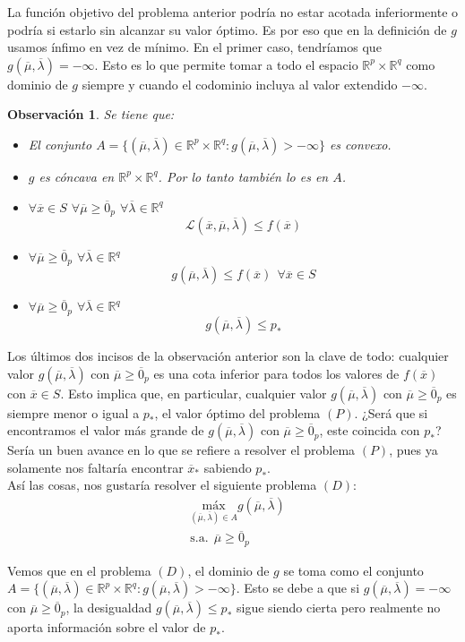 \documentclass[11pt]{report}
\newtheorem{observation}{Observación}[section]
\newcommand{\Rp}{\mathbb{R}^{p}}
\newcommand{\Rq}{\mathbb{R}^{q}}
\newcommand{\mv}{\overline{\mu}}
\newcommand{\lv}{\overline{\lambda}}
\newcommand{\x}{\overline{x}}
\newcommand{\zp}{\overline{0}_{p}}
\newcommand{\La}{\mathcal{L}}
\newcommand{\po}{p_{*}}
\newcommand{\xo}{\overline{x}_{*}}
\begin{document}
La función objetivo del problema anterior podría no estar acotada inferiormente o podría si estarlo sin alcanzar su valor óptimo. Es por eso que en la definición de $g$ usamos ínfimo en vez de mínimo. En el primer caso, tendríamos que $g(\mv, \lv)=-\infty$. Esto es lo que permite tomar a todo el espacio $\Rp\times\Rq$ como dominio de $g$ siempre y cuando el codominio incluya al valor extendido $-\infty$.

\begin{observation} Se tiene que:
\begin{itemize}
\item[(i)] El conjunto $A=\{(\mv,\lv)\in\Rp\times\Rq: g(\mv,\lv)>-\infty\}$ es convexo.
\item[(ii)] $g$ es cóncava en $\Rp\times\Rq$. Por lo tanto también lo es en $A$.
\item[(iii)] $\forall\x\in S$ $\forall \mv\geq\zp$ $\forall\lv\in\Rq$
$$\La(\x,\mv, \lv)\leq f(\x)$$
\item[(iv)] $\forall \mv\geq\zp$ $\forall\lv\in\Rq$
$$g(\mv,\lv)\leq f(\x)\ \ \forall\x \in S$$
\item[(v)] $\forall \mv\geq\zp$ $\forall\lv\in\Rq$
$$g(\mv,\lv)\leq\po$$
\end{itemize}
\end{observation}

Los últimos dos incisos de la observación anterior son la clave de todo: cualquier valor $g(\mv,\lv)$ con $\mv\geq\zp$ es una cota inferior para todos los valores de $f(\x)$ con $\x\in S$. Esto implica que, en particular, cualquier valor $g(\mv,\lv)$ con $\mv\geq\zp$ es siempre menor o igual a $\po$, el valor óptimo del problema $(P)$. ¿Será que si encontramos el valor más grande de $g(\mv,\lv)$ con $\mv\geq\zp$, este coincida con $\po$? Sería un buen avance en lo que se refiere a resolver el problema $(P)$, pues ya solamente nos faltaría encontrar $\xo$ sabiendo $\po$.\\

Así las cosas, nos gustaría resolver el siguiente problema $(D)$:
\begin{equation*}
\begin{aligned}
& \underset{(\mv,\lv)\in A}{\text{máx}} g(\mv,\lv) \\
& \text{s.a.}\ \ \mv\geq\zp
\end{aligned}
\end{equation*}

 Vemos que en el problema $(D)$, el dominio de $g$ se toma como el conjunto $A=\{(\mv,\lv)\in\Rp\times\Rq: g(\mv,\lv)>-\infty\}$. Esto se debe a que si $g(\mv,\lv)=-\infty$ con $\mv\geq\zp$, la desigualdad $g(\mv,\lv)\leq\po$ sigue siendo cierta pero realmente no aporta información sobre el valor de $\po$.\\
\end{document}
